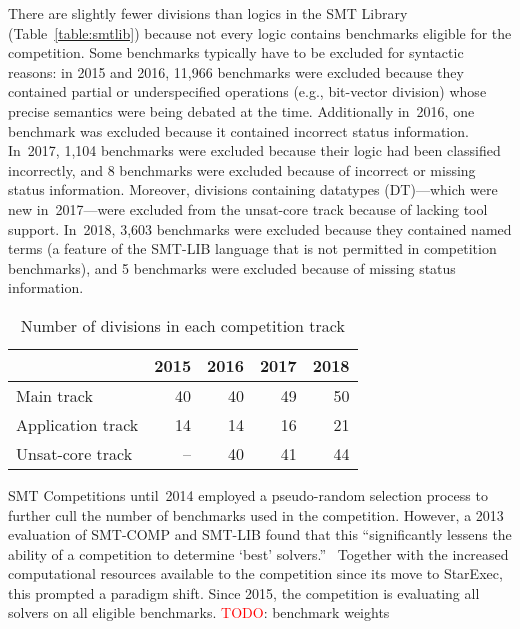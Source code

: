 \documentclass[twoside,11pt]{article}
\newcommand{\TODO}[0]{\textcolor{red}{TODO}}
\begin{document}
There are slightly fewer divisions than logics in the SMT Library
(Table~\ref{table:smtlib}) because not every logic contains benchmarks
eligible for the competition.  Some benchmarks typically have to be
excluded for syntactic reasons: in 2015 and 2016, 11,966 benchmarks
were excluded because they contained partial or underspecified
operations (e.g., bit-vector division) whose precise semantics were
being debated at the time.  Additionally in~2016, one benchmark was
excluded because it contained incorrect status information.  In~2017,
1,104 benchmarks were excluded because their logic had been classified
incorrectly, and 8 benchmarks were excluded because of incorrect or
missing status information.  Moreover, divisions containing datatypes
({DT})---which were new in~2017---were excluded from the unsat-core
track because of lacking tool support.  In~2018, 3,603 benchmarks were
excluded because they contained named terms (a feature of the SMT-LIB
language that is not permitted in competition benchmarks), and 5
benchmarks were excluded because of missing status information.

\begin{table}
  \caption{Number of divisions in each competition track}
  \label{table:divisions}
  \centering
  \begin{tabular}{|l|r|r|r|r|}
    \hline
    & \multicolumn{1}{c|}{2015} & \multicolumn{1}{c|}{2016} & \multicolumn{1}{c|}{2017} & \multicolumn{1}{c|}{2018} \\
    \hline
    Main track        &  40 & 40 & 49 & 50 \\
    Application track &  14 & 14 & 16 & 21 \\
    Unsat-core track  &  -- & 40 & 41 & 44 \\
    \hline
  \end{tabular}
\end{table}

SMT Competitions until~2014 employed a pseudo-random selection process
to further cull the number of benchmarks used in the competition.
However, a 2013 evaluation of SMT-COMP and SMT-LIB found that this
``significantly lessens the ability of a competition to determine
`best' solvers.''~\cite{CSW15} Together with the increased
computational resources available to the competition since its move to
StarExec, this prompted a paradigm shift.  Since 2015, the competition
is evaluating all solvers on all eligible benchmarks. \TODO: benchmark
weights
\end{document}
